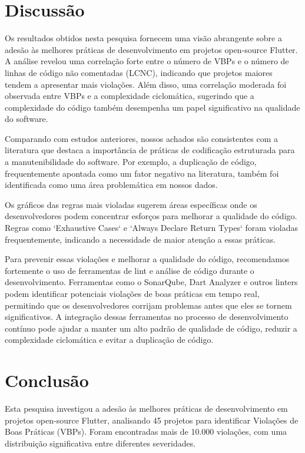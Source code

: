 \documentclass[12pt]{article}
\begin{document}
\section{Discussão}
Os resultados obtidos nesta pesquisa fornecem uma visão abrangente sobre a adesão às melhores práticas de desenvolvimento em projetos open-source Flutter. A análise revelou uma correlação forte entre o número de VBPs e o número de linhas de código não comentadas (LCNC), indicando que projetos maiores tendem a apresentar mais violações. Além disso, uma correlação moderada foi observada entre VBPs e a complexidade ciclomática, sugerindo que a complexidade do código também desempenha um papel significativo na qualidade do software.

Comparando com estudos anteriores, nossos achados são consistentes com a literatura que destaca a importância de práticas de codificação estruturada para a manutenibilidade do software. Por exemplo, a duplicação de código, frequentemente apontada como um fator negativo na literatura, também foi identificada como uma área problemática em nossos dados.

Os gráficos das regras mais violadas sugerem áreas específicas onde os desenvolvedores podem concentrar esforços para melhorar a qualidade do código. Regras como `Exhaustive Cases` e `Always Declare Return Types` foram violadas frequentemente, indicando a necessidade de maior atenção a essas práticas.

Para prevenir essas violações e melhorar a qualidade do código, recomendamos fortemente o uso de ferramentas de lint e análise de código durante o desenvolvimento. Ferramentas como o SonarQube, Dart Analyzer e outros linters podem identificar potenciais violações de boas práticas em tempo real, permitindo que os desenvolvedores corrijam problemas antes que eles se tornem significativos. A integração dessas ferramentas no processo de desenvolvimento contínuo pode ajudar a manter um alto padrão de qualidade de código, reduzir a complexidade ciclomática e evitar a duplicação de código.

\section{Conclusão}
Esta pesquisa investigou a adesão às melhores práticas de desenvolvimento em projetos open-source Flutter, analisando 45 projetos para identificar Violações de Boas Práticas (VBPs). Foram encontradas mais de 10.000 violações, com uma distribuição significativa entre diferentes severidades.
\end{document}
